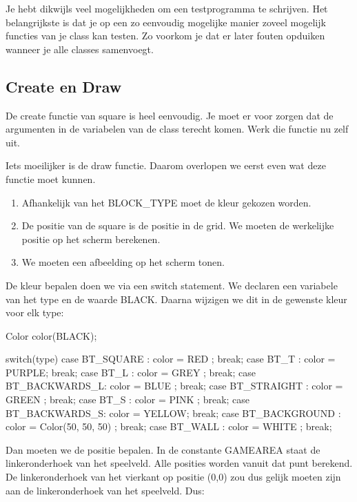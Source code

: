 \begin{note}
Je hebt dikwijls veel mogelijkheden om een testprogramma te schrijven. Het belangrijkste is dat je op een zo eenvoudig mogelijke manier zoveel mogelijk functies van je class kan testen. Zo voorkom je dat er later fouten opduiken wanneer je alle classes samenvoegt.
\end{note}

\subsection{Create en Draw}
De create functie van square is heel eenvoudig. Je moet er voor zorgen dat de argumenten in de variabelen van de class terecht komen. Werk die functie nu zelf uit.

Iets moeilijker is de draw functie. Daarom overlopen we eerst even wat deze functie moet kunnen.

\begin{enumerate}
  \item Afhankelijk van het BLOCK\_TYPE moet de kleur gekozen worden. 
	\item De positie van de square is de positie in de grid. We moeten de werkelijke positie op het scherm berekenen.
	\item We moeten een afbeelding op het scherm tonen.
\end{enumerate}

De kleur bepalen doen we via een switch statement. We declaren een variabele van het type  en de waarde BLACK. Daarna wijzigen we dit in de gewenste kleur voor elk type:

\begin{code}
Color color(BLACK);
      
switch(type)
{
	 case BT_SQUARE     : color = RED   ; break;
	 case BT_T          : color = PURPLE; break;
	 case BT_L          : color = GREY  ; break;
	 case BT_BACKWARDS_L: color = BLUE  ; break;
	 case BT_STRAIGHT   : color = GREEN ; break;
	 case BT_S          : color = PINK  ; break;
	 case BT_BACKWARDS_S: color = YELLOW; break;
	 case BT_BACKGROUND : color = Color(50, 50, 50) ; break;
	 case BT_WALL       : color = WHITE ; break;
}
\end{code}

Dan moeten we de positie bepalen. In de constante GAMEAREA staat de linkeronderhoek van het speelveld. Alle posities worden vanuit dat punt berekend. De linkeronderhoek van het vierkant op positie (0,0) zou dus gelijk moeten zijn aan de linkeronderhoek van het speelveld. Dus:


